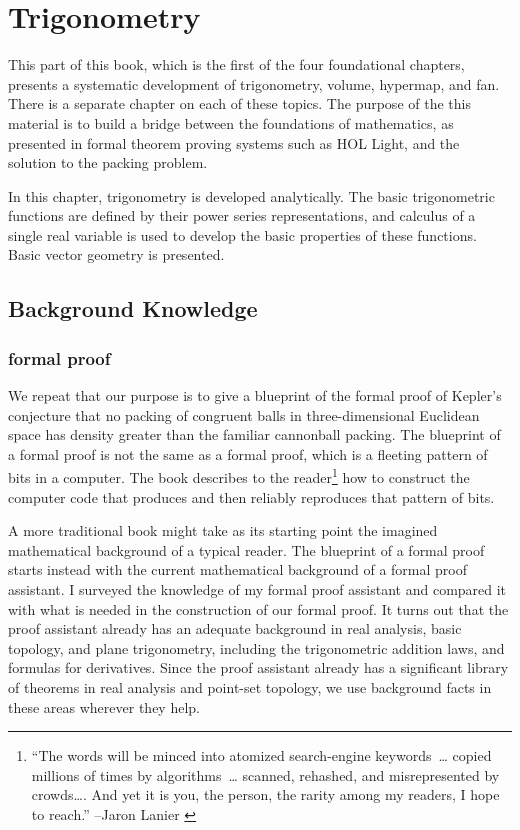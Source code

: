 \chapter{Trigonometry}
\label{part:trig}
%

\begin{summary}
  This part of this book, which is the first of the four foundational
  chapters, presents a systematic development of trigonometry, volume,
  hypermap, and fan.  There is a separate chapter on each of these
  topics.  The purpose of the this material is to build a bridge
  between the foundations of mathematics, as presented in formal
  theorem proving systems such as HOL Light, and the solution to the
  packing problem.  

  In this chapter, trigonometry is developed analytically.  The basic
  trigonometric functions are defined by their power series
  representations, and calculus of a single real variable is used to
  develop the basic properties of these functions.  Basic vector
  geometry is presented.
\end{summary}


\section{Background Knowledge}

\subsection{formal proof}

We repeat that our purpose is to give a
blueprint of the formal proof of Kepler's conjecture that no packing of
congruent balls in three-dimensional Euclidean space has density
greater than the familiar cannonball packing.  The blueprint of a
formal proof is not the same as a formal proof, which is a 
fleeting pattern of bits in a computer.  The book describes to the
reader\footnote{``The words will be minced into atomized search-engine
  keywords~\dots{} copied millions of times by algorithms~\dots{}
  scanned, rehashed, and misrepresented by crowds\dots.  And yet
  it is you, the person, the rarity among my readers, I hope to
  reach.'' --Jaron Lanier \cite{Lanier}}  how to construct the
computer code that  produces and then reliably reproduces that
pattern of bits.

A more traditional book might take as its starting point the imagined
mathematical background of a typical reader.  The blueprint of a
formal proof starts instead with the current mathematical background
of a formal proof assistant.  I surveyed the knowledge of my formal
proof assistant and compared it with what is needed in the
construction of our formal proof.  It turns out that the proof
assistant already has an adequate background in real analysis, basic
topology, and plane trigonometry, including the trigonometric addition
laws, and formulas for derivatives.  Since the proof assistant already
has a significant library of theorems in real analysis and point-set topology, we
 use background facts in these areas wherever they help.


